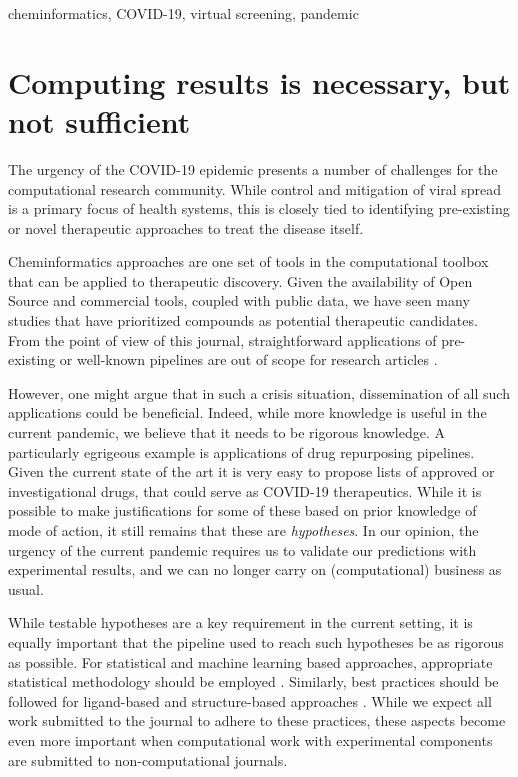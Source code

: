 \documentclass{bmcart}
\begin{document}
\begin{frontmatter}
\begin{abstractbox}
\begin{abstract}
\end{abstract}
\begin{keyword}
  cheminformatics, COVID-19, virtual screening, pandemic
\end{keyword}
\end{abstractbox}

%

\end{frontmatter}



\section*{Computing results is necessary, but not sufficient}

The urgency of the COVID-19 epidemic presents a number of challenges
for the computational research community. While control and mitigation
of viral spread is a primary focus of health systems, this is closely
tied to identifying pre-existing or novel therapeutic approaches to
treat the disease itself. 

Cheminformatics approaches are one set of tools in the computational
toolbox that can be applied to therapeutic discovery. Given the
availability of Open Source and commercial tools, coupled with public
data, we have seen many studies that have prioritized compounds as
potential therapeutic candidates. From the point of view of this
journal, straightforward applications of pre-existing or well-known
pipelines are out of scope for research articles \cite{jcheminf_scope}.

However, one might argue that in such a crisis situation,
dissemination of all such applications could be beneficial. Indeed,
while more knowledge is useful in the current pandemic, we believe
that it needs to be rigorous knowledge. A particularly egrigeous
example is applications of drug repurposing pipelines. Given the
current state of the art it is very easy to propose lists of approved
or investigational drugs, that could serve as COVID-19
therapeutics. While it is possible to make justifications for some of
these based on prior knowledge of mode of action, it still remains
that these are \emph{hypotheses}. In our opinion, the urgency of the
current pandemic requires us to validate our predictions with
experimental results, and we can no longer carry on (computational)
business as usual.

While testable hypotheses are a key requirement in the current
setting, it is equally important that the pipeline used to reach such
hypotheses be as rigorous as possible. For statistical and machine
learning based approaches, appropriate statistical methodology should
be employed \cite{cc_stats_2,cc_stats_1, cc_stats_3}. Similarly, best
practices should be followed for ligand-based \cite{qsar_1, qsar_2}
and structure-based approaches \cite{sbdd_1, sbdd_2}. While we expect
all work submitted to the journal to adhere to these practices, these aspects
become even more important when computational work with experimental
components are submitted to non-computational journals.
\end{document}
